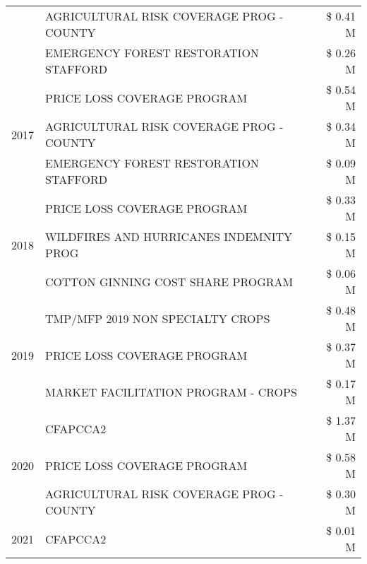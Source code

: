 \begin{tabular}{llr}
 & AGRICULTURAL RISK COVERAGE PROG - COUNTY & \$ 0.41 M \\
 & EMERGENCY FOREST RESTORATION STAFFORD & \$ 0.26 M \\
\cline{1-3}
\multirow[t]{3}{*}{2017} & PRICE LOSS COVERAGE PROGRAM & \$ 0.54 M \\
 & AGRICULTURAL RISK COVERAGE PROG - COUNTY & \$ 0.34 M \\
 & EMERGENCY FOREST RESTORATION STAFFORD & \$ 0.09 M \\
\cline{1-3}
\multirow[t]{3}{*}{2018} & PRICE LOSS COVERAGE PROGRAM & \$ 0.33 M \\
 & WILDFIRES AND HURRICANES INDEMNITY PROG & \$ 0.15 M \\
 & COTTON GINNING COST SHARE PROGRAM & \$ 0.06 M \\
\cline{1-3}
\multirow[t]{3}{*}{2019} & TMP/MFP 2019 NON SPECIALTY CROPS & \$ 0.48 M \\
 & PRICE LOSS COVERAGE PROGRAM & \$ 0.37 M \\
 & MARKET FACILITATION PROGRAM - CROPS & \$ 0.17 M \\
\cline{1-3}
\multirow[t]{3}{*}{2020} & CFAPCCA2 & \$ 1.37 M \\
 & PRICE LOSS COVERAGE PROGRAM & \$ 0.58 M \\
 & AGRICULTURAL RISK COVERAGE PROG - COUNTY & \$ 0.30 M \\
\cline{1-3}
2021 & CFAPCCA2 & \$ 0.01 M \\
\cline{1-3}
\bottomrule
\end{tabular}
